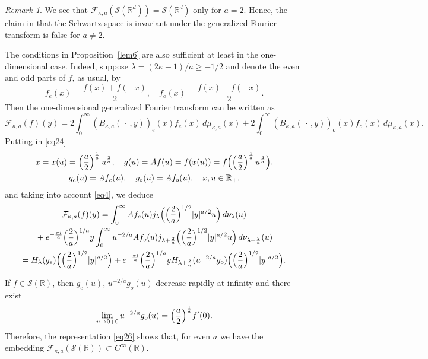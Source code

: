 \documentclass[12pt,twoside,reqno]{amsart}\usepackage[cp1251]{inputenc}
\theoremstyle{plain}
\theoremstyle{remark}
\newtheorem{remark}[theorem]{Remark}
\begin{document}
\begin{remark}\label{rem2---}
We see that $\mathcal{F}_{\kappa,a}(\mathcal{S}(\mathbb{R}^d))=\mathcal{S}(\mathbb{R}^d)$ only for $a=2$. Hence, the claim  in \cite[Lemma~2.12]{Jo16} that the  Schwartz space is  invariant
under the generalized Fourier transform is false for $a\neq 2$.
\end{remark}

The conditions in Proposition~\ref{lem6} are also sufficient at least in the one-dimensional case. Indeed, suppose $\lambda=(2\kappa-1)/a\ge -1/2$ and denote the
even and odd parts of $f$,
as usual, by
\[
f_{e}(x)=\frac{f(x)+f(-x)}{2},\quad f_{o}(x)=\frac{f(x)-f(-x)}{2}.
\]
Then the one-dimensional generalized Fourier transform  can be written as
\begin{equation}\label{eq24}
\mathcal{F}_{\kappa,a}(f)(y)=2\int_{0}^{\infty}(B_{\kappa,a}(\,{\cdot}\,,y))_{e}(x) f_e(x)\,d\mu_{\kappa,a}(x)+
2\int_{0}^{\infty}(B_{\kappa,a}(\,{\cdot}\,,y))_{o}(x) f_o(x)\,d\mu_{\kappa,a}(x).
\end{equation}
Putting in  \eqref{eq24}
\begin{equation}\label{eq25}
\begin{gathered}
x=x(u)=\Bigl(\frac{a}{2}\Bigr)^{\frac{1}{a}}\,u^{\frac{2}{a}},\quad  g(u)=Af(u)=f(x(u))=f\Bigl(\Bigl(\frac{a}{2}\Bigr)^{\frac{1}{a}}\,u^{\frac{2}{a}}\Bigr),\\
g_e(u)=Af_e(u),\quad g_o(u)=Af_o(u),\quad x,u\in\mathbb{R}_+,
\end{gathered}
\end{equation}
and taking into account  \eqref{eq4}, we deduce
\begin{multline}\label{eq26}
\mathcal{F}_{\kappa,a}(f)(y)=\int_{0}^{\infty}Af_e(u)j_{\lambda}\Bigl(\Bigl(\frac{2}{a}\Bigr)^{1/2}|y|^{a/2}u\Bigr)\,d\nu_{\lambda}(u)
\\
{}+e^{-\frac{\pi i}{a}}\Bigl(\frac{2}{a}\Bigr)^{1/a}y
\int_{0}^{\infty}u^{-2/a}Af_o(u)j_{\lambda+\frac{2}{a}}\Bigl(\Bigl(\frac{2}{a}\Bigr)^{1/2}|y|^{a/2}u\Bigr)\,d\nu_{\lambda+\frac{2}{a}}(u)
\\
=H_{\lambda}(g_e)\Bigl(\Bigl(\frac{2}{a}\Bigr)^{1/2}|y|^{a/2}\Bigr)+
e^{-\frac{\pi i}{a}}\Bigl(\frac{2}{a}\Bigr)^{1/a}yH_{\lambda+\frac{2}{a}}(u^{-2/a}g_o)\Bigl(\Bigl(\frac{2}{a}\Bigr)^{1/2}|y|^{a/2}\Bigr).
\end{multline}

If $f\in \mathcal{S}(\mathbb{R})$, then $g_e(u)$, $u^{-2/a}g_o(u)$ decrease rapidly at infinity and there exist
\[
\lim_{u\to 0+0}u^{-2/a}g_o(u)=\Bigl(\frac{a}{2}\Bigr)^{\frac{1}{a}}f'(0).
\]
Therefore, the representation \eqref{eq26} shows that, for even $a$ we have the embedding
$\mathcal{F}_{\kappa,a}(\mathcal{S}(\mathbb{R}))\subset C^{\infty}(\mathbb{R})$.
\end{document}
